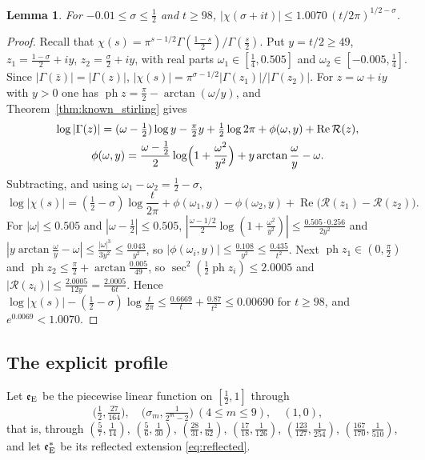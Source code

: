 \documentclass[11pt,a4paper]{article}
\makeatletter
\numberwithin{equation}{section}
\DeclareRobustCommand{\CGref}[1]{\ref{#1}}
\DeclareRobustCommand{\CGeqref}[1]{\eqref{#1}}
\let\CG@origref\ref
\let\CG@origeqref\eqref
\newcommand{\CG@gettip}[1]{\@ifundefined{CGTip@#1}{#1}{\csname CGTip@#1\endcsname}}
\DeclareRobustCommand{\CGref}[1]{\pdftooltip{\CG@origref{#1}}{\CG@gettip{#1}}}
\DeclareRobustCommand{\CGeqref}[1]{\pdftooltip{\CG@origeqref{#1}}{\CG@gettip{#1}}}
\newtheorem{lemma}[theorem]{Lemma}
\theoremstyle{definition}
\theoremstyle{remark}
\newcommand{\eE}{\mathfrak e_{\rm E}}
\makeatother
\begin{document}
\begin{lemma}\label{lem:chi}
For $-0.01\le\sigma\le\frac12$ and $t\ge98$, $|\chi(\sigma+it)|\le1.0070\,(t/2\pi)^{1/2-\sigma}$.
\end{lemma}

\begin{proof}
Recall that $\chi(s)=\pi^{s-1/2}\Gamma(\frac{1-s}2)/\Gamma(\frac s2)$. Put $y=t/2\ge49$, $z_1=\frac{1-\sigma}2+iy$, $z_2=\frac\sigma2+iy$, with real parts $\omega_1\in[\frac14,0.505]$ and $\omega_2\in[-0.005,\frac14]$. Since $|\Gamma(\bar z)|=|\Gamma(z)|$, $|\chi(s)|=\pi^{\sigma-1/2}|\Gamma(z_1)|/|\Gamma(z_2)|$. For $z=\omega+iy$ with $y>0$ one has $\operatorname{ph}z=\frac\pi2-\arctan(\omega/y)$, and Theorem~\CGref{thm:known_stirling} gives
\begin{equation}
\begin{gathered}
\log|\Gamma(z)|=(\omega-\tfrac12)\log y-\tfrac\pi2y+\tfrac12\log2\pi+\phi(\omega,y)+\operatorname{Re}\mathcal R(z),\\
\phi(\omega,y)=\frac{\omega-\frac12}2\log\Bigl(1+\frac{\omega^2}{y^2}\Bigr)+y\arctan\frac\omega y-\omega .
\end{gathered}
\label{eq:stirling_modulus}
\end{equation}
Subtracting, and using $\omega_1-\omega_2=\frac12-\sigma$,
\begin{equation}
\log|\chi(s)|=(\tfrac12-\sigma)\log\frac t{2\pi}+\phi(\omega_1,y)-\phi(\omega_2,y)+\operatorname{Re}\bigl(\mathcal R(z_1)-\mathcal R(z_2)\bigr).
\label{eq:disp_11}
\end{equation}
For $|\omega|\le0.505$ and $|\omega-\frac12|\le0.505$, $|\frac{\omega-1/2}2\log(1+\frac{\omega^2}{y^2})|\le\frac{0.505\cdot0.256}{2y^2}$ and $|y\arctan\frac\omega y-\omega|\le\frac{|\omega|^3}{3y^2}\le\frac{0.043}{y^2}$, so $|\phi(\omega_i,y)|\le\frac{0.108}{y^2}\le\frac{0.435}{t^2}$. Next $\operatorname{ph}z_1\in(0,\frac\pi2)$ and $\operatorname{ph}z_2\le\frac\pi2+\arctan\frac{0.005}{49}$, so $\sec^2(\frac12\operatorname{ph}z_i)\le2.0005$ and $|\mathcal R(z_i)|\le\frac{2.0005}{12y}=\frac{2.0005}{6t}$. Hence $\log|\chi(s)|-(\frac12-\sigma)\log\frac t{2\pi}\le\frac{0.6669}t+\frac{0.87}{t^2}\le0.00690$ for $t\ge98$, and $e^{0.0069}<1.0070$.
\end{proof}

\subsection{The explicit profile}\label{subsec:explicit_profile}
Let $\eE$ be the piecewise linear function on $[\frac12,1]$ through
\begin{equation}
\bigl(\tfrac12,\tfrac{27}{164}\bigr),\quad\bigl(\sigma_m,\tfrac1{2^m-2}\bigr)\ (4\le m\le9),\quad(1,0),
\label{eq:explicit_nodes}
\end{equation}
that is, through $(\frac57,\frac1{14})$, $(\frac56,\frac1{30})$, $(\frac{28}{31},\frac1{62})$, $(\frac{17}{18},\frac1{126})$, $(\frac{123}{127},\frac1{254})$, $(\frac{167}{170},\frac1{510})$, and let $\eE^*$ be its reflected extension \CGeqref{eq:reflected}.
\end{document}
